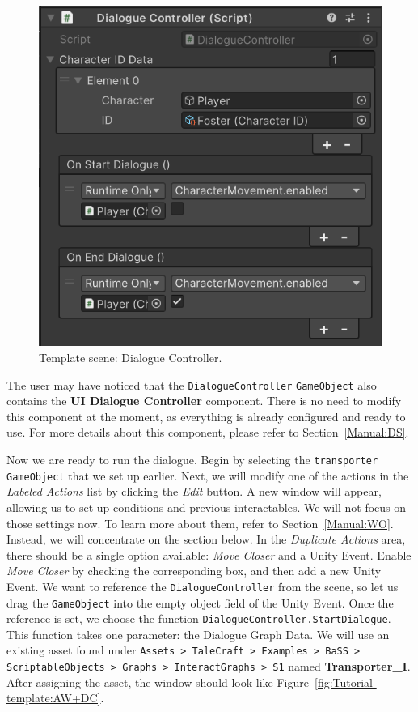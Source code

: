 \begin{figure}[H]
\centering
\includegraphics[width=0.6\linewidth]{img/User doc/image_2025-07-09_104007947.png}
\caption{Template scene: Dialogue Controller.}
\label{fig:Tutorial-template:DC}
\end{figure}

The user may have noticed that the \texttt{DialogueController} \texttt{GameObject} also contains the \textbf{UI Dialogue Controller} component. There is no need to modify this component at the moment, as everything is already configured and ready to use. For more details about this component, please refer to Section~\ref{Manual:DS}.

Now we are ready to run the dialogue. Begin by selecting the \texttt{transporter} \texttt{GameObject} that we set up earlier. Next, we will modify one of the actions in the \textit{Labeled Actions} list by clicking the \textit{Edit} button. A new window will appear, allowing us to set up conditions and previous interactables. We will not focus on those settings now. To learn more about them, refer to Section~\ref{Manual:WO}. Instead, we will concentrate on the section below. In the \textit{Duplicate Actions} area, there should be a single option available: \textit{Move Closer} and a Unity Event. Enable \textit{Move Closer} by checking the corresponding box, and then add a new Unity Event. We want to reference the \texttt{DialogueController} from the scene, so let us drag the \texttt{GameObject} into the empty object field of the Unity Event. Once the reference is set, we choose the function \texttt{DialogueController.StartDialogue}. This function takes one parameter: the Dialogue Graph Data. We will use an existing asset found under \texttt{Assets > TaleCraft > Examples > BaSS > ScriptableObjects > Graphs > InteractGraphs > S1} named \textbf{Transporter\_I}. After assigning the asset, the window should look like Figure~\ref{fig:Tutorial-template:AW+DC}.

